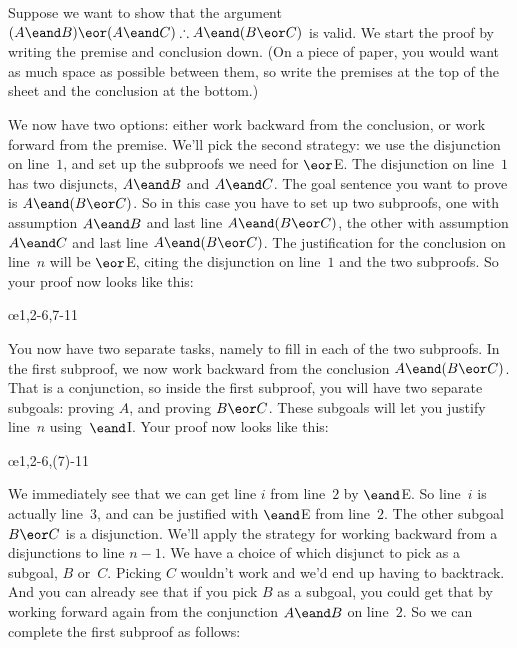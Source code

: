 Suppose we want to show that the argument $(A \eand B) \eor (A \eand C) \therefore A \eand (B \eor C)$ is valid. We start the proof by writing the premise and conclusion down. (On a piece of paper, you would want as much space as possible between them, so write the premises at the top of the sheet and the conclusion at the bottom.)
\begin{fitchproof}
\ellipsesline
\end{fitchproof}
We now have two options: either work backward from the conclusion, or work forward from the premise. We'll pick the second strategy: we use the disjunction on line~$1$, and set up the subproofs we need for $\eor$E. The disjunction on line~$1$ has two disjuncts, $A \eand B$ and $A \eand C$. The goal sentence you want to prove is $A \eand (B \eor C)$. So in this case you have to set up two subproofs, one with assumption $A \eand B$ and last line $A \eand (B \eor C)$, the other with assumption $A \eand C$ and last line $A \eand (B \eor C)$. The justification for the conclusion on line~$n$ will be $\eor$E, citing the disjunction on line~$1$ and the two subproofs. So your proof now looks like this:
\begin{fitchproof}
	\open
	\ellipsesline 
	\close
	\open
	\ellipsesline
	\close
	\oe{1,2-6,7-11}
\end{fitchproof}
You now have two separate tasks, namely to fill in each of the two subproofs. In the first subproof, we now work backward from the conclusion $A \eand (B \eor C)$. That is a conjunction, so inside the first subproof, you will have two separate subgoals: proving $A$, and proving $B \eor C$. These subgoals will let you justify line~$n$ using~$\eand$I. Your proof now looks like this:
\begin{fitchproof}
	\open
	\ellipsesline
	\ellipsesline
	\close
	\open
	\ellipsesline
	\close
	\oe{1,2-6,(7)-11}
\end{fitchproof}
We immediately see that we can get line $i$ from line~$2$ by $\eand$E. So line~$i$ is actually line~$3$, and can be justified with $\eand$E from line~$2$. The other subgoal $B \eor C$ is a disjunction. We'll apply the strategy for working backward from a disjunctions to line $n-1$. We have a choice of which disjunct to pick as a subgoal, $B$ or~$C$. Picking $C$ wouldn't work and we'd end up having to backtrack. And you can already see that if you pick $B$ as a subgoal, you could get that by working forward again from the conjunction $A \eand B$ on line~$2$. So we can complete the first subproof as follows:
